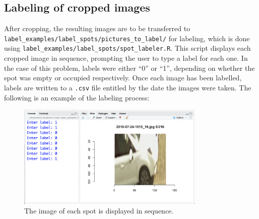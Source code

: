 \documentclass[a4paper, 11pt]{article} %
\begin{document}
	\subsection{Labeling of cropped images}
		After cropping, the resulting images are to be transferred to\\
		\texttt{label\_examples/label\_spots/pictures\_to\_label/} for labeling, 
		which is done using 
		\texttt{label\_examples/label\_spots/spot\_labeler.R}. This script displays
		each cropped image in sequence, prompting the user to type a label for each
		one. In the case of this problem, labels were either ``0'' or ``1'',
		depending on whether the spot was empty or occupied respectively. Once each
		image has been labelled, labels are written to a \texttt{.csv} file
		entitled by the date the images were taken. The following is an example of
		the labeling process:\\
		\begin{figure}[H]
			\centering
			\includegraphics[width=0.8\textwidth]{figures/spot_labeler_example}
			\caption{The image of each spot is displayed in sequence.}
		\end{figure}	
\end{document}
